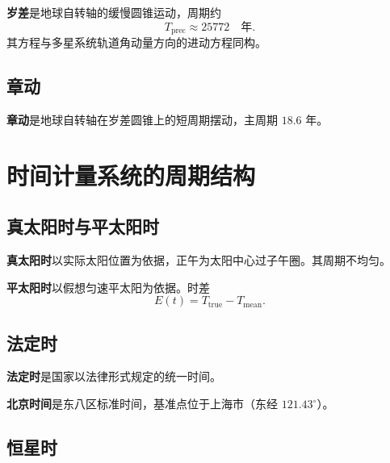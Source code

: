 \begin{definition}[岁差]\label{def:precession}
\textbf{岁差}是地球自转轴的缓慢圆锥运动，周期约
\[
T_{\text{prec}}\approx25772\quad\text{年}.
\]
其方程与多星系统轨道角动量方向的进动方程同构。
\end{definition}

\subsection{章动}

\begin{definition}[章动]\label{def:nutation}
\textbf{章动}是地球自转轴在岁差圆锥上的短周期摆动，主周期 \(18.6\) 年。
\end{definition}

\section{时间计量系统的周期结构}
\label{sec:astro_time_measurement}

\subsection{真太阳时与平太阳时}

\begin{definition}[真太阳时]\label{def:true_solar_time}
\textbf{真太阳时}以实际太阳位置为依据，正午为太阳中心过子午圈。其周期不均匀。
\end{definition}

\begin{definition}[平太阳时]\label{def:mean_solar_time}
\textbf{平太阳时}以假想匀速平太阳为依据。时差
\[
E(t)=T_{\text{true}}-T_{\text{mean}}.
\]
\end{definition}

\subsection{法定时}

\begin{definition}[法定时]\label{def:legal_time}
\textbf{法定时}是国家以法律形式规定的统一时间。
\end{definition}

\begin{definition}[北京时间]\label{def:beijing_time}
\textbf{北京时间}是东八区标准时间，基准点位于上海市（东经 \(121.43^\circ\)）。
\end{definition}

\subsection{恒星时}

